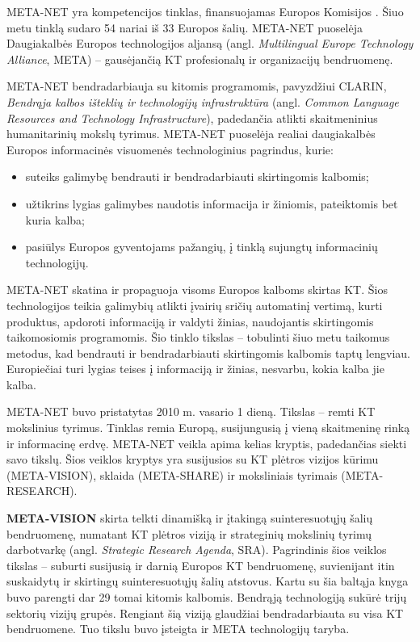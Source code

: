 \begin{multicols}{2}

META-NET yra kompetencijos tinklas, finansuojamas Europos Komisijos \cite{rehm2011}. Šiuo metu tinklą sudaro 54 nariai iš 33 Europos šalių. META-NET puoselėja Daugiakalbės Europos technologijos aljansą (angl. \textit{Multilingual Europe Technology Alliance}, META) – gausėjančią KT profesionalų ir organizacijų bendruomenę.

META-NET bendradarbiauja su kitomis programomis, pavyzdžiui CLARIN, \textit{Bendrąja kalbos išteklių ir technologijų infrastruktūra} (angl. \textit{Common Language Resources and Technology Infrastructure}), padedančia atlikti skaitmeninius humanitarinių mokslų tyrimus. META-NET puoselėja realiai daugiakalbės Europos informacinės visuomenės technologinius pagrindus, kurie:

\begin{itemize}
\item suteiks galimybę bendrauti ir bendradarbiauti skirtingomis kalbomis;
\item užtikrins lygias galimybes naudotis informacija ir žiniomis, pateiktomis bet kuria kalba;
\item pasiūlys Europos gyventojams pažangių, į tinklą sujungtų informacinių technologijų.
\end{itemize}

META-NET skatina ir propaguoja visoms Europos kalboms skirtas KT. Šios technologijos teikia galimybių atlikti įvairių sričių automatinį vertimą, kurti produktus, apdoroti informaciją ir valdyti žinias, naudojantis skirtingomis taikomosiomis programomis. Šio tinklo tikslas – tobulinti šiuo metu taikomus metodus, kad bendrauti ir bendradarbiauti skirtingomis kalbomis taptų lengviau. Europiečiai turi lygias teises į informaciją ir žinias, nesvarbu, kokia kalba jie kalba.

META-NET buvo pristatytas 2010 m. vasario 1 dieną. Tikslas – remti KT mokslinius tyrimus. Tinklas remia Europą, susijungusią į vieną skaitmeninę rinką ir informacinę erdvę. META-NET veikla apima kelias kryptis, padedančias siekti savo tikslų. Šios veiklos kryptys yra susijusios su KT plėtros vizijos kūrimu (META-VISION), sklaida (META-SHARE) ir moksliniais tyrimais (META-RESEARCH).   

\textbf{META-VISION}  skirta telkti dinamišką ir įtakingą suinteresuotųjų šalių bendruomenę, numatant KT plėtros viziją ir strateginių mokslinių tyrimų darbotvarkę (angl. \textit{Strategic Research Agenda}, SRA). Pagrindinis šios veiklos tikslas – suburti susijusią ir darnią Europos KT bendruomenę, suvienijant itin suskaidytų ir skirtingų suinteresuotųjų šalių atstovus. Kartu su šia baltąja knyga buvo parengti dar 29 tomai kitomis kalbomis. Bendrąją technologiją sukūrė trijų sektorių vizijų grupės. Rengiant šią viziją glaudžiai bendradarbiauta su visa KT bendruomene. Tuo tikslu buvo įsteigta ir META technologijų taryba.


\end{multicols}
